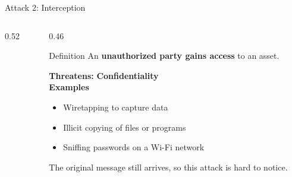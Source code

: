 \documentclass[aspectratio=169,11pt,xcolor={table}]{beamer}
\begin{document}
\begin{frame}{Attack 2: Interception}
  \begin{columns}[c]
    \begin{column}{0.52\textwidth}
      \centering
    \end{column}
    \begin{column}{0.46\textwidth}
      \begin{alertblock}{Definition}
        An \textbf{unauthorized party gains access} to an asset.
      \end{alertblock}
      \vspace{1mm}
      \textbf{Threatens:} \textcolor{ocean}{\textbf{Confidentiality}}\\[3pt]
      \textbf{Examples}
      \begin{itemize}\small
        \item Wiretapping to capture data
        \item Illicit copying of files or programs
        \item Sniffing passwords on a Wi-Fi network
      \end{itemize}
      \vspace{1mm}
      {\small\textcolor{ink!70}{The original message still arrives, so this attack is hard to notice.}}
    \end{column}
  \end{columns}
\end{frame}
\end{document}
